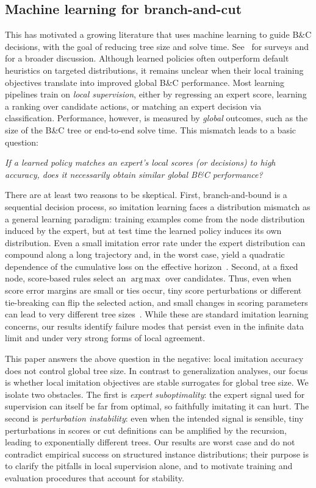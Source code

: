 \documentclass[smallextended,envcountsect]{svjour3} %
\newcommand{\0}{\mathbf{0}}
\DeclareMathOperator{\argmax}{arg\,max} %
\newcommand{\1}{\mathbf{1}} %
\begin{document}
\subsection{Machine learning for branch-and-cut}
This has motivated a growing literature that uses machine learning to guide B\&C decisions, with the goal of reducing tree size and solve time. See~\citep{bengio2021machine,scavuzzo2024machine} for surveys and  for a broader discussion.
Although learned policies often outperform default heuristics on targeted distributions, it remains unclear when their local training objectives translate into improved global B\&C performance.
Most learning pipelines train on \emph{local supervision}, either by regressing an expert score, learning a ranking over candidate actions, or matching an expert decision via classification.
Performance, however, is measured by \emph{global} outcomes, such as the size of the B\&C tree or end-to-end solve time.
This mismatch leads to a basic question:

\emph{If a learned policy matches an expert's local scores (or decisions) to high accuracy, does it necessarily obtain similar global B\&C performance?}

There are at least two reasons to be skeptical.
First, branch-and-bound is a sequential decision process, so imitation learning faces a distribution mismatch as a general learning paradigm: training examples come from the node distribution induced by the expert, but at test time the learned policy induces its own distribution. Even a small imitation error rate under the expert distribution can compound along a long trajectory and, in the worst case, yield a quadratic dependence of the cumulative loss on the effective horizon~\citep{ross2011reduction}.
Second, at a fixed node, score-based rules select an $\argmax$ over candidates. Thus, even when score error margins are small or ties occur, tiny score perturbations or different tie-breaking can flip the selected action, and small changes in scoring parameters can lead to very different tree sizes~\citep{balcan2018learning}.
While these are standard imitation learning concerns, our results identify failure modes that persist even in the infinite data limit and under very strong forms of local agreement.

This paper answers the above question in the negative: local imitation accuracy does not control global tree size.
In contrast to generalization analyses, our focus is whether local imitation objectives are stable surrogates for global tree size.
We isolate two obstacles.
The first is \emph{expert suboptimality}: the expert signal used for supervision can itself be far from optimal, so faithfully imitating it can hurt.
The second is \emph{perturbation instability}: even when the intended signal is sensible, tiny perturbations in scores or cut definitions can be amplified by the recursion, leading to exponentially different trees.
Our results are worst case and do not contradict empirical success on structured instance distributions; their purpose is to clarify the pitfalls in local supervision alone, and to motivate training and evaluation procedures that account for stability.
\end{document}
